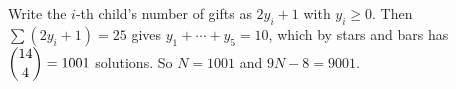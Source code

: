 Write the $i$-th child's number of gifts as $2y_i+1$ with $y_i\ge0$. Then $\sum(2y_i+1)=25$ gives $y_1+\cdots+y_5=10$, which by stars and bars has $\dbinom{14}{4}=1001$ solutions. So $N=1001$ and $9N-8=\boxed{9001}$.
